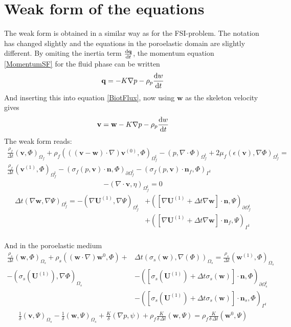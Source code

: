 \section{Weak form of the equations}
The weak form is obtained in a similar way as for the FSI-problem. The notation has changed slightly and the equations in the poroelastic domain are slightly different. By omiting the inertia term $\frac{\mathrm{d} \mathbf{q}}{\mathrm{d} t}$, the momentum equation \eqref{MomentumSF} for the fluid phase can be written
\begin{align}
\mathbf{q} = -K\nabla p  - \rho_p\frac{\mathrm{d} w}{\mathrm{d} t} 
\end{align}
And inserting this into equation \eqref{BiotFlux}, now using $\mathbf{w}$ as the skeleton velocity gives 
\begin{align}
\mathbf{v} = \mathbf{w} - K\nabla p - \rho_p \frac{\mathrm{d} w}{\mathrm{d} t}
\end{align}
The weak form reads:
\begin{align}
\frac{\rho_f}{\Delta t}(\mathbf{v},\Phi)_{\Omega_f} + \rho_f(((\mathbf{v}-\mathbf{w})\cdot \nabla) \mathbf{v}^{(0)}, \Phi)_{\Omega_f^t} - (p,\nabla \cdot \Phi)_{\Omega_f^t} + 2\mu_f(\epsilon(\mathbf{v}), \nabla \Phi)_{\Omega_f^t} = \\ 
\frac{\rho_f}{\Delta t}(\mathbf{v}^{(1)},\Phi)_{\Omega_f^t} - (\sigma_f(p,\mathbf{v})\cdot \mathbf{n}, \Phi)_{\partial \Omega_f^t} - (\sigma_f(p,\mathbf{v}) \cdot \mathbf{n}_f, \Phi)_{\Gamma^t} \label{VarMom}
\end{align}
\begin{align}
-(\nabla \cdot \mathbf{v},\eta)_{\Omega_f^t} = 0 \label{VarCon}
\end{align}
\begin{align}
\Delta t(\nabla \mathbf{w}, \nabla \Psi)_{\Omega_f^t} = - (\nabla \mathbf{U}^{(1)}, \nabla \Psi)_{\Omega_f^t} & + ([\nabla \mathbf{U}^{(1)} + \Delta t \nabla \mathbf{w}] \cdot \mathbf{n}, \Psi)_{\partial \Omega_f^t} \\ 
& + ([\nabla \mathbf{U}^{(1)} + \Delta t \nabla \mathbf{w}] \cdot \mathbf{n}_f, \Psi)_{\Gamma^t} \label{VarMesh}
\end{align}
\\
And in the poroelastic medium
\begin{align}
\frac{\rho_s}{\Delta t}(\mathbf{w},\Phi)_{\Omega_s} + \rho_s((\mathbf{w}\cdot \nabla)\mathbf{w}^0,\Phi) + & \Delta t (\sigma_s (\mathbf{w}), \nabla(\Phi))_{\Omega_s}  = \frac{\rho_s}{\Delta t}(\mathbf{w}^{(1)},\Phi)_{\Omega_s} \\ - (\sigma_s(\mathbf{U}^{(1)}), \nabla \Phi)_{\Omega_s} & - ([\sigma_s(\mathbf{U}^{(1)}) + \Delta t \sigma_s(\mathbf{w})]\cdot \mathbf{n}, \Phi)_{\partial \Omega_s^t} \\
& - ([\sigma_s(\mathbf{U}^{(1)}) + \Delta t \sigma_s(\mathbf{w})]\cdot \mathbf{n}_s, \Phi)_{\Gamma^t} \label{VarMom2}
\end{align}
\begin{align}
\frac{1}{\delta}(\mathbf{v},\Psi)_{\Omega_s} - \frac{1}{\delta}(\mathbf{w},\Psi)_{\Omega_s} + \frac{K}{\delta}(\nabla p, \psi) + \rho_f\frac{K}{\delta \, \Delta t}(\mathbf{w},\Psi) = \rho_f\frac{K}{\delta \, \Delta t}(\mathbf{w}^0,\Psi) \label{VarMesh2}
\end{align}

